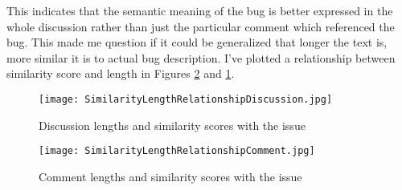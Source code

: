 This indicates that the semantic meaning of the bug is better expressed in the whole discussion rather than just the particular comment which referenced the bug. This made me question if it could be generalized that longer the text is, more similar it is to actual bug description. I've plotted a relationship between similarity score and length in Figures \ref{fig:SimilarityLengthRelationshipComment} and \ref{fig:SimilarityLengthRelationshipDiscussion}.

\begin{figure}[H]%
    \centering
	\texttt{[image: SimilarityLengthRelationshipDiscussion.jpg]}
    \caption{Discussion lengths and similarity scores with the issue}%
    \label{fig:SimilarityLengthRelationshipDiscussion}%
\end{figure}

\begin{figure}[H]%
    \centering
	\texttt{[image: SimilarityLengthRelationshipComment.jpg]}
    \caption{Comment lengths and similarity scores with the issue}%
    \label{fig:SimilarityLengthRelationshipComment}%
\end{figure}



